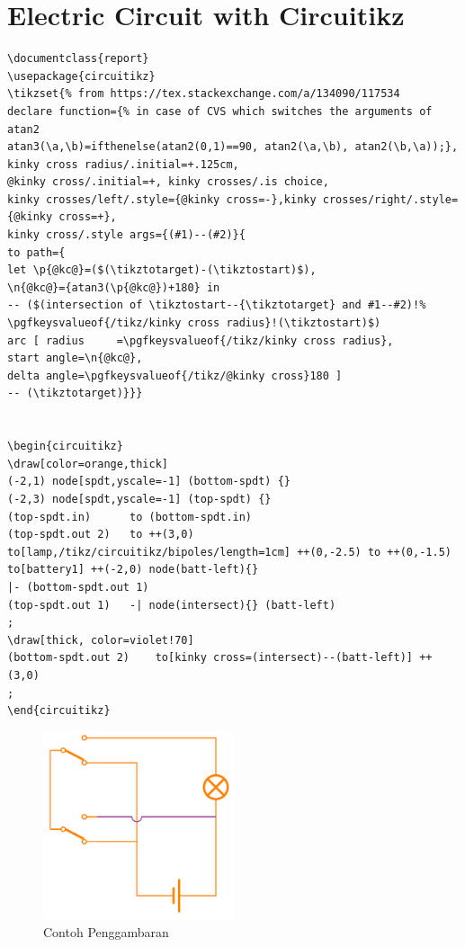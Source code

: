 \sloppy


\section{Electric Circuit with Circuitikz}


\begin{verbatim}
\documentclass{report}
\usepackage{circuitikz}
\tikzset{% from https://tex.stackexchange.com/a/134090/117534
declare function={% in case of CVS which switches the arguments of atan2
atan3(\a,\b)=ifthenelse(atan2(0,1)==90, atan2(\a,\b), atan2(\b,\a));},
kinky cross radius/.initial=+.125cm,
@kinky cross/.initial=+, kinky crosses/.is choice,
kinky crosses/left/.style={@kinky cross=-},kinky crosses/right/.style={@kinky cross=+},
kinky cross/.style args={(#1)--(#2)}{
to path={
let \p{@kc@}=($(\tikztotarget)-(\tikztostart)$),
\n{@kc@}={atan3(\p{@kc@})+180} in
-- ($(intersection of \tikztostart--{\tikztotarget} and #1--#2)!%
\pgfkeysvalueof{/tikz/kinky cross radius}!(\tikztostart)$)
arc [ radius     =\pgfkeysvalueof{/tikz/kinky cross radius},
start angle=\n{@kc@},
delta angle=\pgfkeysvalueof{/tikz/@kinky cross}180 ]
-- (\tikztotarget)}}}


\begin{circuitikz}
\draw[color=orange,thick] 
(-2,1) node[spdt,yscale=-1] (bottom-spdt) {}
(-2,3) node[spdt,yscale=-1] (top-spdt) {}
(top-spdt.in)      to (bottom-spdt.in)
(top-spdt.out 2)   to ++(3,0) 
to[lamp,/tikz/circuitikz/bipoles/length=1cm] ++(0,-2.5) to ++(0,-1.5)
to[battery1] ++(-2,0) node(batt-left){}
|- (bottom-spdt.out 1)
(top-spdt.out 1)   -| node(intersect){} (batt-left)
;
\draw[thick, color=violet!70] 
(bottom-spdt.out 2)    to[kinky cross=(intersect)--(batt-left)] ++(3,0)
;
\end{circuitikz}

\end{verbatim}


\begin{figure}[ht]
	\centerline{\includegraphics[width=0.50\textwidth]{gambar/Electric_circuit}}
	\caption{Contoh Penggambaran}
	\label{contoh}
\end{figure}	

